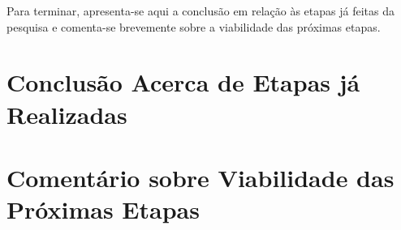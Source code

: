 Para terminar, apresenta-se aqui a conclusão em relação às etapas já feitas da
pesquisa e comenta-se brevemente sobre a viabilidade das próximas etapas. 
\section{Conclusão Acerca de Etapas já Realizadas}

\section{Comentário sobre Viabilidade das Próximas Etapas}
